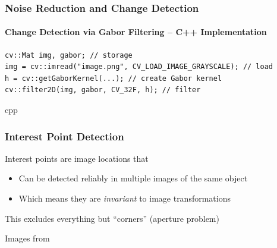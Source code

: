 \documentclass[xetex,professionalfont]{beamer}
\begin{document}
\begin{frame}[fragile]
\frametitle{Noise Reduction and Change Detection}
\framesubtitle{Change Detection via Gabor Filtering -- C++ Implementation}


\begin{verbatim}
cv::Mat img, gabor; // storage
img = cv::imread("image.png", CV_LOAD_IMAGE_GRAYSCALE); // load
h = cv::getGaborKernel(...); // create Gabor kernel
cv::filter2D(img, gabor, CV_32F, h); // filter

\end{verbatim}{cpp}

\end{frame}


\begin{frame}
\frametitle{Interest Point Detection}

Interest points are image locations that
\begin{itemize}
	\item Can be detected reliably in multiple images of the same object
	\item Which means they are \emph{invariant} to image transformations
\end{itemize} %

\bigskip
This excludes everything but \enquote{corners} (aperture problem) %

\begin{center}
	{\centering Images from \cite{szeliski2010}}
\end{center}

\end{frame}

\end{document}
